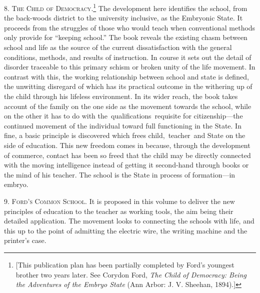 \documentclass[openany,nobib]{tufte-book}
\begin{document}
8. \textsc{The Child of Democracy}.\footnote{{[}This publication plan has been
  partially completed by Ford's youngest brother two years later. See
  Corydon Ford, \emph{The Child of Democracy: Being the Adventures of
  the Embryo State} (Ann Arbor: J. V. Sheehan, 1894).{]}} The
development here identifies the school, from the back-woods district to
the university inclusive, as the Embryonic State. It proceeds from the
struggles of those who would teach when conventional methods only
provide for ``keeping school.'' The book reveals the existing chasm
between school and life as the source of the current dissatisfaction
with the general conditions, methods, and results of instruction. In
course it sets out the detail of disorder traceable to this primary
schism or broken unity of the life movement. In contrast with this, the
working relationship between school and state is defined, the unwitting
disregard of which has its practical outcome in the withering up of the
child through his lifeless environment. In its wider reach, the book
takes account of the family on the one side as the movement towards the
school, while on the other it has to do with
the~qualifications~requisite for citizenship---the continued movement of
the individual toward full functioning in the State. In fine, a basic
principle is discovered which frees child,~teacher~and State on the side
of education. This new freedom comes in because, through the development
of commerce, contact has been so freed that the child may be directly
connected with the moving intelligence instead of getting it second-hand
through books or the mind of his teacher. The school is the State in
process of formation---in embryo.~

\vspace{0.05in}

9. \textsc{Ford's Common School}. It is proposed in this volume to deliver the
new principles of education to the teacher as working tools, the aim
being their detailed application. The movement looks to connecting the
schools with life, and this up to the point of admitting the electric
wire, the writing machine and the printer's case.~

\vspace{0.05in}
\end{document}
